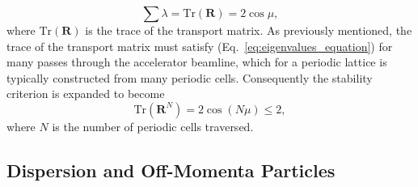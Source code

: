 \documentclass[../main.tex]{subfiles}
\begin{document}
\begin{equation}
\sum\lambda = \boldsymbol{\mathrm{Tr}}\left(\boldsymbol{R}\right) = 2\cos\mu,
\label{eq:eigenvalue_stability}
\end{equation}
where $\boldsymbol{\mathrm{Tr}}\left(\boldsymbol{R}\right)$ is the trace of the transport matrix. As previously mentioned, the trace of the transport matrix must satisfy (Eq.~\ref{eq:eigenvalues_equation}) for many passes through the accelerator beamline, which for a periodic lattice is typically constructed from many periodic cells. Consequently the stability criterion is expanded to become
\begin{equation}
\boldsymbol{\mathrm{Tr}}\left(\boldsymbol{R}^{N}\right) = 2\cos\left(N\mu\right) \leq 2, 
\label{eq:stability_criterion}    
\end{equation}
where $N$ is the number of periodic cells traversed.

\subsection{Dispersion and Off-Momenta Particles} 
\label{sec:dispersion_off_momentum_particles}
\end{document}
